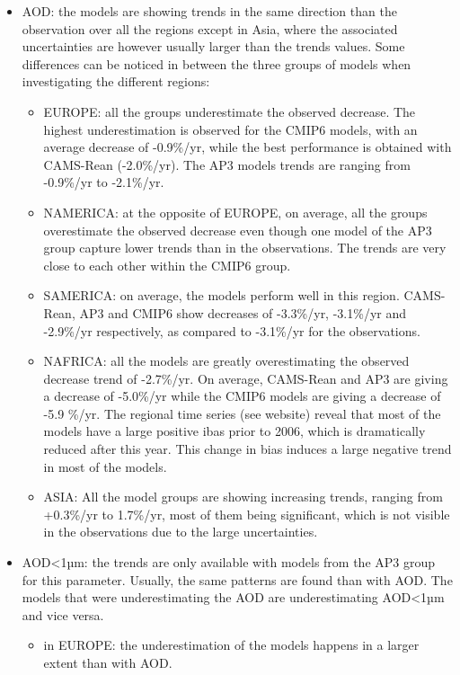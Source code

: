 \documentclass[journal abbreviation, manuscript]{copernicus}
\begin{document}
\begin{itemize}
 \item AOD: the models are showing trends in the same direction than the observation over all the regions except in Asia, where the associated uncertainties are however usually larger than the trends values. Some differences can be noticed in between the three groups of models when investigating the different regions:
       \begin{itemize}
        \item EUROPE: all the groups underestimate the observed decrease. The highest underestimation is observed for the CMIP6 models, with an average decrease of -0.9\%/yr, while the best performance is obtained with CAMS-Rean (-2.0\%/yr). The AP3 models trends are ranging from -0.9\%/yr to -2.1\%/yr.
        \item NAMERICA: at the opposite of EUROPE, on average, all the groups overestimate the observed decrease even though one model of the AP3 group capture lower trends than in the observations. The trends are very close to each other within the CMIP6 group.
        \item SAMERICA: on average, the models perform well in this region. CAMS-Rean, AP3 and CMIP6 show decreases of -3.3\%/yr, -3.1\%/yr and -2.9\%/yr respectively, as compared to -3.1\%/yr for the observations.
        \item NAFRICA: all the models are greatly overestimating the observed decrease trend of -2.7\%/yr. On average, CAMS-Rean and AP3 are giving a decrease of -5.0\%/yr while the CMIP6 models are giving a decrease of -5.9 \%/yr. The regional time series (see website) reveal that most of the models have a large positive ibas prior to 2006, which is dramatically reduced after this year. This change in bias induces a large negative trend in most of the models.
        \item ASIA: All the model groups are showing increasing trends, ranging from +0.3\%/yr to 1.7\%/yr, most of them being significant, which is not visible in the observations due to the large uncertainties.
       \end{itemize}
 \item AOD<1µm: the trends are only available with models from the AP3 group for this parameter. Usually, the same patterns are found than with AOD. The models that were underestimating the AOD are underestimating AOD<1µm and vice versa.
       \begin{itemize}
        \item in EUROPE: the underestimation of the models happens in a larger extent than with AOD.

\end{itemize}
\end{itemize}
\end{document}
